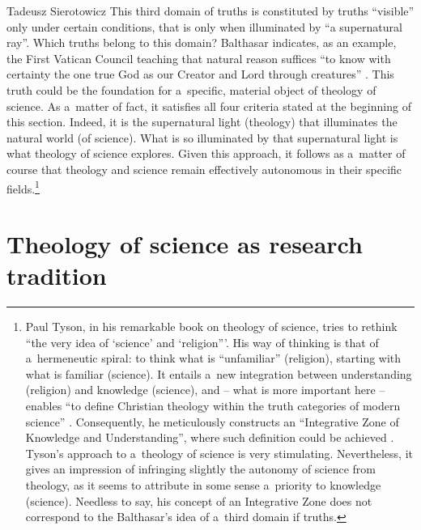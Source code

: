 \begin{artengenv}{Tadeusz Sierotowicz}
This third domain of truths is constituted by truths ``visible'' only under certain conditions, that is only when illuminated by ``a supernatural ray''. Which truths belong to this domain? Balthasar indicates, as an example, the First Vatican Council teaching that natural reason suffices ``to know with certainty the one true God as our Creator and Lord through creatures'' 
\parencite[][p.12]{balthasar_theo-logic_2000}. %
 This truth could be the foundation for a~specific, material object of theology of science. As a~matter of fact, it satisfies all four criteria stated at the beginning of this section. Indeed, it is the supernatural light (theology) that illuminates the natural world (of science). What is so illuminated by that supernatural light is what theology of science explores. Given this approach, it follows as a~matter of course that theology and science remain effectively autonomous in their specific fields.\footnote{Paul Tyson, in his remarkable book on theology of science, tries to rethink ``the very idea of ‘science' and ‘religion'''. His way of thinking is that of a~hermeneutic spiral: to think what is ``unfamiliar'' (religion), starting with what is familiar (science). It entails a~new integration between understanding (religion) and knowledge (science), and -- what is more important here -- enables ``to define Christian theology within the truth categories of modern science'' 
\parencite[][p.9]{tyson_christian_2022}. %
 Consequently, he meticulously constructs an ``Integrative Zone of Knowledge and Understanding'', where such definition could be achieved 
\parencite[][chap.9]{tyson_christian_2022}. %
 Tyson's approach to a~theology of science is very stimulating. Nevertheless, it gives an impression of infringing slightly the autonomy of science from theology, as it seems to attribute in some sense a~priority to knowledge (science). Needless to say, his concept of an Integrative Zone does not correspond to the Balthasar's idea of a~third domain if truths.}



\section{Theology of science as research tradition}


\end{artengenv}
